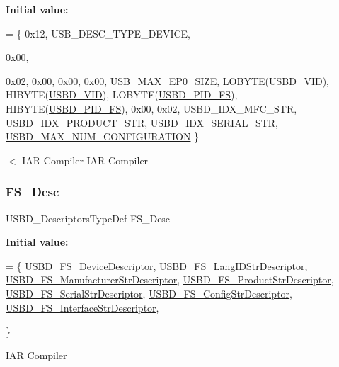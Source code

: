 {\bfseries Initial value\+:}
\begin{DoxyCode}
=
  \{
    0x12,                       
    USB\_DESC\_TYPE\_DEVICE,       




  
    0x00,                       

    0x02,
    0x00,                       
    0x00,                       
    0x00,                       
    USB\_MAX\_EP0\_SIZE,          
    LOBYTE(\hyperlink{group__USBD__DESC__Private__Defines_gac5251397ce2246b546b472cd802e6d62}{USBD\_VID}),           
    HIBYTE(\hyperlink{group__USBD__DESC__Private__Defines_gac5251397ce2246b546b472cd802e6d62}{USBD\_VID}),           
    LOBYTE(\hyperlink{group__USBD__DESC__Private__Defines_gaa6f9e36da39c9881963cabf42df4d216}{USBD\_PID\_FS}),           
    HIBYTE(\hyperlink{group__USBD__DESC__Private__Defines_gaa6f9e36da39c9881963cabf42df4d216}{USBD\_PID\_FS}),           
    0x00,                       
    0x02,
    USBD\_IDX\_MFC\_STR,           
    USBD\_IDX\_PRODUCT\_STR,       
    USBD\_IDX\_SERIAL\_STR,        
    \hyperlink{group__USBD__CONF__Exported__Defines_gaef1f76fda5677f5ad43c25a2ba4ebcde}{USBD\_MAX\_NUM\_CONFIGURATION}  
  \}
\end{DoxyCode}
$<$ I\+AR Compiler I\+AR Compiler \mbox{\label{group__USBD__DESC__Private__Variables_gae36d67393118d9d8531a8d633e23a797}} 
\subsubsection{\texorpdfstring{F\+S\+\_\+\+Desc}{FS\_Desc}}
{\footnotesize\ttfamily U\+S\+B\+D\+\_\+\+Descriptors\+Type\+Def F\+S\+\_\+\+Desc}

{\bfseries Initial value\+:}
\begin{DoxyCode}
=
\{
  \hyperlink{group__USBD__DESC__Private__Functions_ga14798be38c08a37163e53167032485ff}{USBD\_FS\_DeviceDescriptor},
  \hyperlink{group__USBD__DESC__Private__Functions_gac02628ceb6a6a071e192dcb85063c0cc}{USBD\_FS\_LangIDStrDescriptor}, 
  \hyperlink{group__USBD__DESC__Private__Functions_ga6427a671827813efe1a46c3dfcb05683}{USBD\_FS\_ManufacturerStrDescriptor},
  \hyperlink{group__USBD__DESC__Private__Functions_ga0ec558c0303daabb851d584109a56514}{USBD\_FS\_ProductStrDescriptor},
  \hyperlink{group__USBD__DESC__Private__Functions_gaad2a1d1451821845eda602a82b1cd213}{USBD\_FS\_SerialStrDescriptor},
  \hyperlink{group__USBD__DESC__Private__Functions_ga40ed2a0fb60c50a285983a09ba6921d6}{USBD\_FS\_ConfigStrDescriptor},
  \hyperlink{group__USBD__DESC__Private__Functions_gab248f43276f92d982ab5853111e4fb10}{USBD\_FS\_InterfaceStrDescriptor},


  
\}
\end{DoxyCode}
I\+AR Compiler 